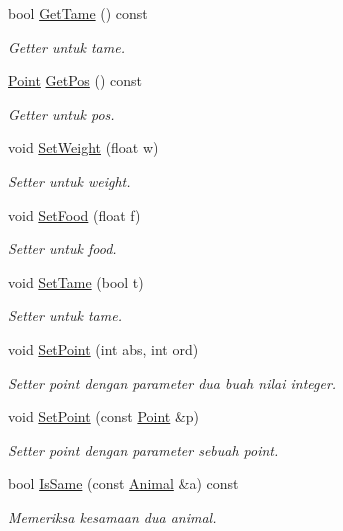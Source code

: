 \begin{DoxyCompactItemize}
bool \hyperlink{classAnimal_a2c4de7b5eb65afd3208306d85b595560}{Get\+Tame} () const 
\begin{DoxyCompactList}\small\item\em Getter untuk tame. \end{DoxyCompactList}\item 
\hyperlink{classPoint}{Point} \hyperlink{classAnimal_a183e4addbbccbe06a77e57bc8893cec1}{Get\+Pos} () const 
\begin{DoxyCompactList}\small\item\em Getter untuk pos. \end{DoxyCompactList}\item 
void \hyperlink{classAnimal_a255a8ea15491f55565d0ee0db4f40f66}{Set\+Weight} (float w)
\begin{DoxyCompactList}\small\item\em Setter untuk weight. \end{DoxyCompactList}\item 
void \hyperlink{classAnimal_a71051747b69f2747b5262491483e8662}{Set\+Food} (float f)
\begin{DoxyCompactList}\small\item\em Setter untuk food. \end{DoxyCompactList}\item 
void \hyperlink{classAnimal_ad3a24c661579fc5caf63ecf8fc48cf4f}{Set\+Tame} (bool t)
\begin{DoxyCompactList}\small\item\em Setter untuk tame. \end{DoxyCompactList}\item 
void \hyperlink{classAnimal_a754c7eb7a8ca6d8bd3e30650546a410d}{Set\+Point} (int abs, int ord)
\begin{DoxyCompactList}\small\item\em Setter point dengan parameter dua buah nilai integer. \end{DoxyCompactList}\item 
void \hyperlink{classAnimal_a02e187a6407bc83c46698544c912be15}{Set\+Point} (const \hyperlink{classPoint}{Point} \&p)
\begin{DoxyCompactList}\small\item\em Setter point dengan parameter sebuah point. \end{DoxyCompactList}\item 
bool \hyperlink{classAnimal_afc66abcbc6efb71c81d5306ea368cffb}{Is\+Same} (const \hyperlink{classAnimal}{Animal} \&a) const 
\begin{DoxyCompactList}\small\item\em Memeriksa kesamaan dua animal. \end{DoxyCompactList}\item 

\end{DoxyCompactItemize}
